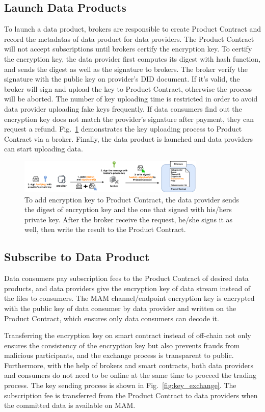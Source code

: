 \documentclass[conference]{IEEEtran}
\begin{document}
\subsection{Launch Data Products}
To launch a data product, brokers are responsible to create Product Contract and record the metadatas of data product for data providers. The Product Contract will not accept subscriptions until brokers certify the encryption key. To certify the encryption key, the data provider first computes its digest with hash function, and sends the digest as well as the signature to brokers. The broker verify the signature with the public key on provider's DID document. If it's valid, the broker will sign and upload the key to Product Contract, otherwise the process will be aborted. The number of key uploading time is restricted in order to avoid data provider uploading fake keys frequently. If data consumers find out the encryption key does not match the provider's signature after payment, they can request a refund. Fig.~\ref{fig:key_upload} demonstrates the key uploading process to Product Contract via a broker. Finally, the data product is launched and data providers can start uploading data.
\begin{figure}[h]
    \centering
    \includegraphics[width=3.5in]{key_upload}
    \caption{To add encryption key to Product Contract, the data provider sends the digest of encryption key and the one that signed with his/hers private key. After the broker receive the request, he/she signs it as well, then write the result to the Product Contract.}
    \label{fig:key_upload}
\end{figure}

\subsection{Subscribe to Data Product}
Data consumers pay subscription fees to the Product Contract of desired data products, and data providers give the encryption key of data stream instead of the files to consumers. The MAM channel/endpoint encryption key is encrypted with the public key of data consumer by data provider and written on the Product Contract, which ensures only data consumers can decode it.

Transferring the encryption key on smart contract instead of off-chain not only ensures the consistency of the encryption key but also prevents frauds from malicious participants, and the exchange process is transparent to public. Furthermore, with the help of brokers and smart contracts, both data providers and consumers do not need to be online at the same time to proceed the trading process. The key sending process is shown in Fig.~\ref{fig:key_exchange}. The subscription fee is transferred from the Product Contract to data providers when the committed data is available on MAM.
\end{document}
